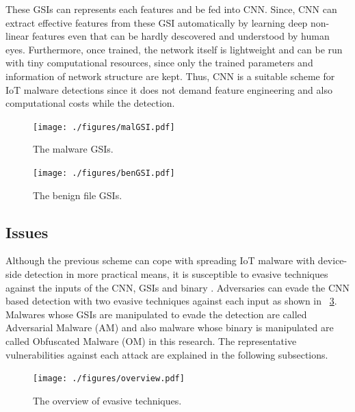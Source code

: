 \documentclass{ieeeaccess}
\begin{document}
These GSIs can represents each features and be fed into CNN.
Since, CNN can extract effective features from these GSI automatically by learning deep non-linear features even that can be hardly descovered and understood by human eyes.
Furthermore, once trained, the network itself is lightweight and can be run with tiny computational resources, since only the trained parameters and information of network structure are kept.
Thus, CNN is a suitable scheme for IoT malware detections since it does not demand feature engineering and also computational costs while the detection.

\begin{figure}[t]
 \centering
 \texttt{[image: ./figures/malGSI.pdf]}
 \caption{The malware GSIs.} 
 \label{fig:malGSI}
\end{figure}
\begin{figure}[t]
 \centering
 \texttt{[image: ./figures/benGSI.pdf]}
 \caption{The benign file GSIs.} 
 \label{fig:benGSI}
\end{figure}

\subsection{Issues} 
Although the previous scheme can cope with spreading IoT malware with device-side detection in more practical means, it is susceptible to evasive techniques against the inputs of the CNN, GSIs and binary \cite{attack1, attack2}.
Adversaries can evade the CNN based detection with two evasive techniques against each input as shown in \figurename~\ref{fig:ov}.
Malwares whose GSIs are manipulated to evade the detection are called Adversarial Malware (AM) and also malware whose binary is manipulated are called Obfuscated Malware (OM) in this research.  
The representative vulnerabilities against each attack are explained in the following subsections.

\begin{figure}[t]
 \centering
 \texttt{[image: ./figures/overview.pdf]}
 \caption{The overview of evasive techniques.} 
 \label{fig:ov}
\end{figure}
\end{document}
